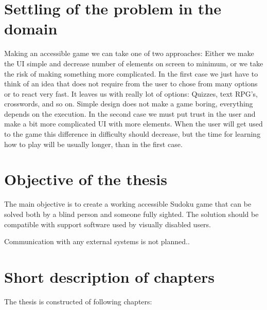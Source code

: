 \documentclass[a4paper,twoside,12pt]{book}
\begin{document}
\section{Settling of the problem in the domain}
\par
Making an accessible game we can take one of two approaches: Either we make the UI simple and decrease number of elements on screen to minimum, or we take the risk of making something more complicated. In the first case we just have to think of an idea that does not require from the user to chose from many options or to react very fast. It leaves us with really lot of options: Quizzes, text RPG's, crosswords, and so on. Simple design does not make a game boring, everything depends on the execution. In the second case we must put trust in the user and make a bit more complicated UI with more elements. When the user will get used to the game this difference in difficulty should decrease, but the time for learning how to play will be usually longer, than in the first case.

\section{Objective of the thesis}

\par The main objective is to create a working accessible Sudoku game that can be solved both by a blind person and someone fully sighted. The solution should be compatible with support software used by visually disabled users.
\par Communication with any external systems is not planned..

\section{Short description of chapters}

\par The thesis is constructed of following chapters:
\end{document}
